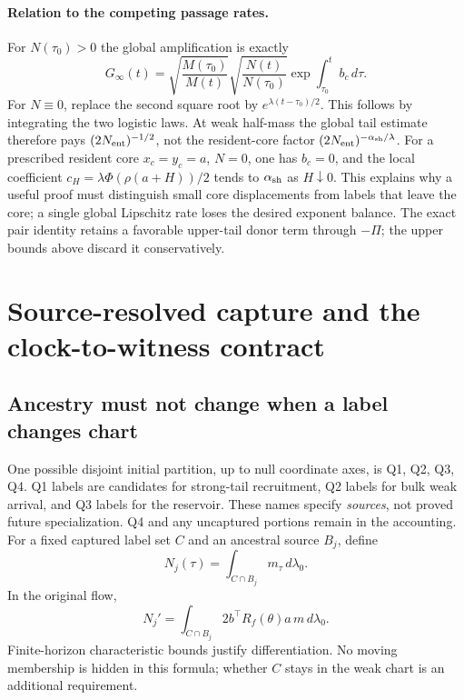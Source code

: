 \documentclass[11pt]{article}
\numberwithin{equation}{section}
\theoremstyle{remark}\newtheorem{remark}[theorem]{Remark}
\newcommand{\dd}{\,d}
\newcommand{\1}{\mathbf 1}
\begin{document}
\paragraph{Relation to the competing passage rates.}
For $N(\tau_0)>0$ the global amplification is exactly
\begin{equation}\label{inc:AN02:tail:v1:globalG}
 G_\infty(t)=
 \sqrt{\frac{M(\tau_0)}{M(t)}}
 \sqrt{\frac{N(t)}{N(\tau_0)}}
 \exp\int_{\tau_0}^t b_c\dd\tau.
\end{equation}
For $N\equiv0$, replace the second square root by
$e^{\lambda(t-\tau_0)/2}$. This follows by integrating the two logistic
laws. At weak half-mass the global tail estimate therefore pays
$(2N_{\rm ent})^{-1/2}$, not the resident-core factor
$(2N_{\rm ent})^{-\alpha_{\rm sh}/\lambda}$.
For a prescribed resident core $x_c=y_c=a$, $N=0$, one has $b_c=0$,
and the local coefficient $c_H=\lambda\Phi(\rho(a+H))/2$ tends to
$\alpha_{\rm sh}$ as $H\downarrow0$. This explains why a useful proof
must distinguish small core displacements from labels that leave the core;
a single global Lipschitz rate loses the desired exponent balance.
The exact pair identity retains a favorable upper-tail donor term through
$-\Pi$; the upper bounds above discard it conservatively.

\section{Source-resolved capture and the clock-to-witness contract}
\label{inc:AN02:tail:v1:sources}
\subsection{Ancestry must not change when a label changes chart}
One possible disjoint initial partition, up to null coordinate axes, is
Q1, Q2, Q3, Q4. Q1 labels are candidates for strong-tail recruitment, Q2
labels for bulk weak arrival, and Q3 labels for the reservoir. These names
specify \emph{sources}, not proved future specialization. Q4 and any
uncaptured portions remain in the accounting.
For a fixed captured label set $C$ and an ancestral source $B_j$, define
\[
 N_j(\tau)=\int_{C\cap B_j}m_\tau\dd\lambda_0.
\]
In the original flow,
\begin{equation}\label{inc:AN02:tail:v1:exactsource}
 N_j'=\int_{C\cap B_j}2b^\top R_f(\theta)a\,m\dd\lambda_0.
\end{equation}
Finite-horizon characteristic bounds justify differentiation. No moving
membership is hidden in this formula; whether $C$ stays in the weak chart
is an additional requirement.
\end{document}
